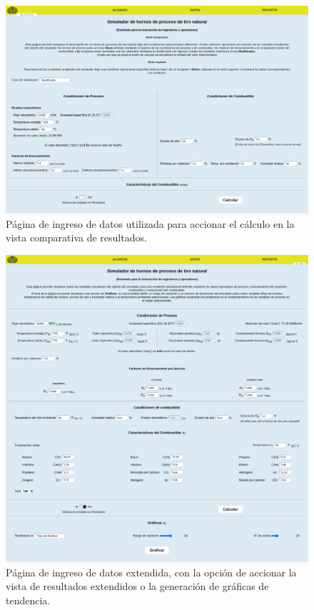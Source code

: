 \begin{figure}[hbt]
\begin{center}
\includegraphics[scale=0.2]{images/datos}
\caption[Página de ingreso de datos para comparación]{Página de ingreso de datos utilizada para accionar el cálculo en la vista comparativa de resultados.}
\label{fig:datos}
\end{center}
\end{figure}

\begin{figure}[hbt]
\begin{center}
\includegraphics[scale=0.2]{images/fulldatos}
\caption[Página de ingreso de datos extendida]{Página de ingreso de datos extendida, con la opción de accionar la vista de resultados extendidos o la generación de gráficas de tendencia.}
\label{fig:fulldatos}
\end{center}
\end{figure}

